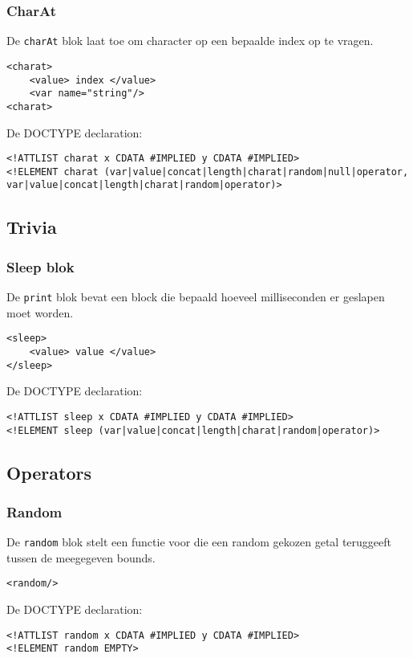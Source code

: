 \documentclass[]{article}
\begin{document}
\subsubsection{CharAt}
De \texttt{charAt} blok laat toe om character op een bepaalde index op te vragen.
\lstset{language=XML}
\begin{lstlisting}
<charat>
	<value> index </value>
	<var name="string"/>
<charat>
\end{lstlisting}
De DOCTYPE declaration: 
\lstset{language=XML}
\begin{lstlisting}
<!ATTLIST charat x CDATA #IMPLIED y CDATA #IMPLIED>
<!ELEMENT charat (var|value|concat|length|charat|random|null|operator, var|value|concat|length|charat|random|operator)>
\end{lstlisting}

\subsection{Trivia}
\subsubsection{Sleep blok}
De \texttt{print} blok bevat een block die bepaald hoeveel milliseconden er geslapen moet worden.
\lstset{language=XML}
\begin{lstlisting}
<sleep>
	<value> value </value>
</sleep>
\end{lstlisting}
De DOCTYPE declaration: 
\lstset{language=XML}
\begin{lstlisting}
<!ATTLIST sleep x CDATA #IMPLIED y CDATA #IMPLIED>
<!ELEMENT sleep (var|value|concat|length|charat|random|operator)>
\end{lstlisting}

\subsection{Operators}
\subsubsection{Random}
De \texttt{random} blok stelt een functie voor die een random gekozen getal teruggeeft tussen de meegegeven bounds. 
\lstset{language=XML}
\begin{lstlisting}
<random/>
\end{lstlisting}
De DOCTYPE declaration: 
\lstset{language=XML}
\begin{lstlisting}
<!ATTLIST random x CDATA #IMPLIED y CDATA #IMPLIED>
<!ELEMENT random EMPTY>
\end{lstlisting}\
\end{document}
